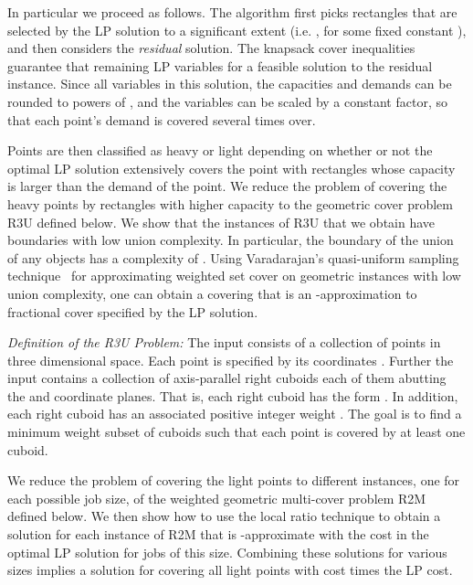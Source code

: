 \documentclass[11pt]{article}
\begin{document}
In particular we proceed as follows.
The algorithm first picks rectangles that are selected by
the LP solution to a significant extent (i.e. , for some fixed constant ),
and then considers the {\em residual} solution.
The knapsack cover inequalities guarantee that remaining LP variables for a feasible solution 
to the residual instance. Since all variables  in this solution,
the capacities and demands can be rounded to powers of , and the variables can be scaled by
a constant factor, so that each point's demand is covered several times over. 


Points are then classified as heavy or light depending on whether or not
the optimal LP solution extensively covers the point with rectangles whose capacity
is larger than the demand of the point. 
We reduce the problem of covering the heavy points by rectangles with higher capacity to the
geometric cover problem R3U defined below. 
We show that the instances of R3U that we obtain 
have boundaries with low union complexity.
In particular, the boundary of the union of any  objects 
has a complexity of .
Using Varadarajan's quasi-uniform sampling technique~\cite{Varadarajan09} 
for approximating weighted set cover on geometric instances with low union 
complexity, one can obtain a covering that is  an
-approximation to fractional cover specified by the
LP solution.



\medskip

{\em Definition of the R3U Problem:}
The input consists of a collection of  points in three dimensional space.
Each point  is specified by its coordinates .
Further the input contains a collection  of axis-parallel right cuboids
each of them abutting the  and  coordinate planes. 
That is, each right cuboid  has the form  
. 
In addition, each right cuboid  has an associated positive 
integer weight .
The goal is to find a minimum weight subset  of cuboids
such that each point  is covered by at least one cuboid.


\medskip

We reduce the problem of covering the light points to 
different instances, one for each possible job size, 
of the weighted geometric multi-cover problem R2M defined below. 
We then show how to use the local ratio technique to obtain a solution
for each instance of R2M that is -approximate with the cost in the
optimal LP solution for jobs of this size. Combining these solutions for various sizes
implies a solution for covering all light points with cost  times the LP cost.
\end{document}
